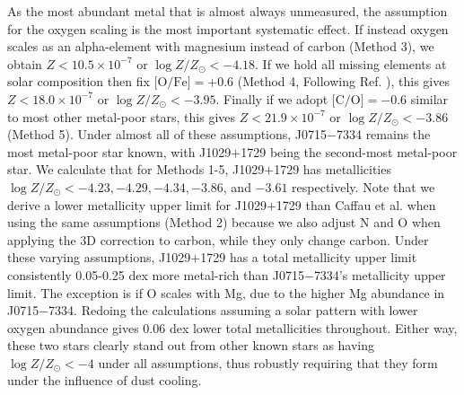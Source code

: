 \documentclass{natureprintstyle}
\newcommand{\logzzsun}{\ensuremath{\log Z/Z_\odot}\xspace}
\newcommand{\umpstar}{J0715$-$7334\xspace}
\newcommand{\caffaustar}{J1029$+$1729\xspace}
\begin{document}
As the most abundant metal that is almost always unmeasured, the assumption for the oxygen scaling is the most important systematic effect.
If instead oxygen scales as an alpha-element with magnesium instead of carbon (Method 3), we obtain $Z < 10.5 \times 10^{-7}$ or $\logzzsun < -4.18$.
If we hold all missing elements at solar composition then fix $\mbox{[O/Fe]}=+0.6$ (Method 4, Following Ref. \cite{Lagae2023}), this gives $Z < 18.0 \times 10^{-7}$ or $\logzzsun < -3.95$.
Finally if we adopt $\mbox{[C/O]}=-0.6$ similar to most other metal-poor stars\cite{Amarsi2019}, this gives $Z < 21.9 \times 10^{-7}$ or $\logzzsun < -3.86$ (Method 5).
Under almost all of these assumptions, \umpstar remains the most metal-poor star known, with \caffaustar being the second-most metal-poor star.
We calculate that for Methods 1-5, \caffaustar has metallicities $\logzzsun < -4.23, -4.29, -4.34, -3.86$, and $-3.61$ respectively. 
Note that we derive a lower metallicity upper limit for \caffaustar than Caffau et al.\cite{Caffau2024} when using the same assumptions (Method 2) because we also adjust N and O when applying the 3D correction to carbon, while they only change carbon.
Under these varying assumptions, \caffaustar has a total metallicity upper limit consistently 0.05-0.25 dex more metal-rich than \umpstar's metallicity upper limit. The exception is if O scales with Mg, due to the higher Mg abundance in \umpstar.
Redoing the calculations assuming a solar pattern with lower oxygen abundance\cite{Asplund2021} gives 0.06 dex lower total metallicities throughout. Either way, these two stars clearly stand out from other known stars as having $\logzzsun < -4$ under all assumptions, thus robustly requiring that they form under the influence of dust cooling\cite{Schneider2012}.
\end{document}
